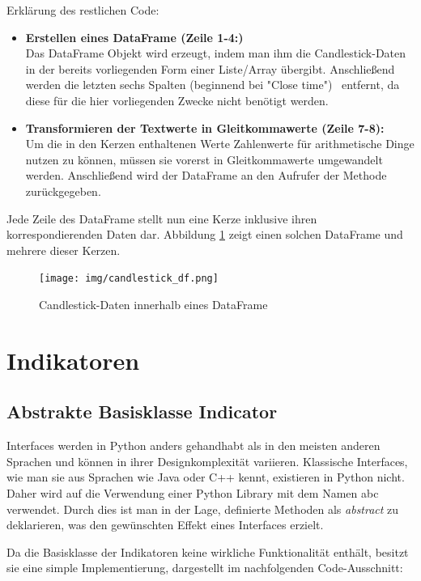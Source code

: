 \documentclass[oneside]{ausarbeitung}
\begin{document}
Erklärung des restlichen Code:
\begin{itemize}
	\item \textbf{Erstellen eines DataFrame (Zeile 1-4:)} \\
		Das DataFrame Objekt wird erzeugt, indem man ihm die Candlestick-Daten in
		der bereits vorliegenden Form einer Liste/Array übergibt. Anschließend
		werden die letzten sechs Spalten (beginnend bei "Close time") \ entfernt, 
		da diese für die hier vorliegenden Zwecke nicht benötigt werden.
	\item \textbf{Transformieren der Textwerte in Gleitkommawerte (Zeile 7-8):} \\
		Um die in den Kerzen enthaltenen Werte Zahlenwerte für arithmetische
		Dinge nutzen zu können, müssen sie vorerst in Gleitkommawerte umgewandelt
		werden.	Anschließend wird der DataFrame an den Aufrufer der Methode
		zurückgegeben.	
\end{itemize}

Jede Zeile des DataFrame stellt nun eine Kerze inklusive ihren korrespondierenden Daten dar. Abbildung \ref{fig:16} zeigt einen solchen DataFrame und mehrere dieser Kerzen.

\begin{figure}[H]
  \centering
  \texttt{[image: img/candlestick\_df.png]}
  \caption{Candlestick-Daten innerhalb eines DataFrame}
  \label{fig:16}
\end{figure}


\section{Indikatoren}
\label{sec:indikatoren}

\subsection{Abstrakte Basisklasse Indicator}
\label{sub:abstrakte_basisklasse_indikator}

Interfaces werden in Python anders gehandhabt als in den meisten anderen Sprachen und können in ihrer Designkomplexität variieren. Klassische Interfaces, wie man sie aus Sprachen wie Java oder C++ kennt, existieren in Python nicht. Daher wird auf die Verwendung einer Python Library mit dem Namen \ac{abc} verwendet. Durch dies ist man in der Lage, definierte Methoden als \textit{abstract} zu deklarieren, was den gewünschten Effekt eines Interfaces erzielt.

Da die Basisklasse der Indikatoren keine wirkliche Funktionalität enthält, besitzt sie eine simple Implementierung, dargestellt im nachfolgenden Code-Ausschnitt:
\end{document}
